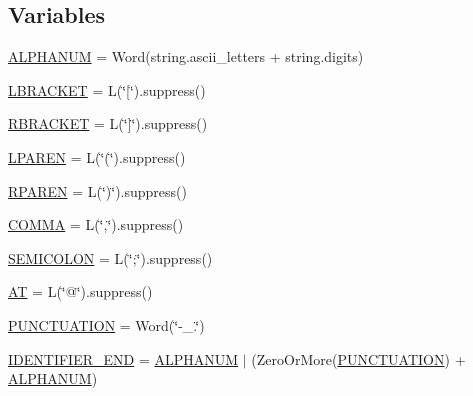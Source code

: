 \subsection*{Variables}
\begin{DoxyCompactItemize}
\item 
\hyperlink{namespacepkg__resources_1_1__vendor_1_1packaging_1_1requirements_a1b6a0f93aab1e0de65e69f84fdd3fc4d}{A\+L\+P\+H\+A\+N\+UM} = Word(string.\+ascii\+\_\+letters + string.\+digits)
\item 
\hyperlink{namespacepkg__resources_1_1__vendor_1_1packaging_1_1requirements_a6981533f5347746cbc109a2be33dd020}{L\+B\+R\+A\+C\+K\+ET} = L(\char`\"{}\mbox{[}\char`\"{}).suppress()
\item 
\hyperlink{namespacepkg__resources_1_1__vendor_1_1packaging_1_1requirements_abbada36c7d12f89f9f8dbe5eed7e38e1}{R\+B\+R\+A\+C\+K\+ET} = L(\char`\"{}\mbox{]}\char`\"{}).suppress()
\item 
\hyperlink{namespacepkg__resources_1_1__vendor_1_1packaging_1_1requirements_aba638d4a7a02c4f6f8ffbeab724fc830}{L\+P\+A\+R\+EN} = L(\char`\"{}(\char`\"{}).suppress()
\item 
\hyperlink{namespacepkg__resources_1_1__vendor_1_1packaging_1_1requirements_a574a651b148dc603efe931b6a86da736}{R\+P\+A\+R\+EN} = L(\char`\"{})\char`\"{}).suppress()
\item 
\hyperlink{namespacepkg__resources_1_1__vendor_1_1packaging_1_1requirements_a9ab8299202b519b3a7135ddadb5d7fe4}{C\+O\+M\+MA} = L(\char`\"{},\char`\"{}).suppress()
\item 
\hyperlink{namespacepkg__resources_1_1__vendor_1_1packaging_1_1requirements_adedef3a0386c0115ceeccd5722983b22}{S\+E\+M\+I\+C\+O\+L\+ON} = L(\char`\"{};\char`\"{}).suppress()
\item 
\hyperlink{namespacepkg__resources_1_1__vendor_1_1packaging_1_1requirements_a17fe47e230847213e62d4c11fb80e042}{AT} = L(\char`\"{}@\char`\"{}).suppress()
\item 
\hyperlink{namespacepkg__resources_1_1__vendor_1_1packaging_1_1requirements_a4a9bf3636e77b3a6e9167ed836ff570e}{P\+U\+N\+C\+T\+U\+A\+T\+I\+ON} = Word(\char`\"{}-\/\+\_\+.\char`\"{})
\item 
\hyperlink{namespacepkg__resources_1_1__vendor_1_1packaging_1_1requirements_af4b6965e1e4945622373dc67f4352916}{I\+D\+E\+N\+T\+I\+F\+I\+E\+R\+\_\+\+E\+ND} = \hyperlink{namespacepkg__resources_1_1__vendor_1_1packaging_1_1requirements_a1b6a0f93aab1e0de65e69f84fdd3fc4d}{A\+L\+P\+H\+A\+N\+UM} $\vert$ (Zero\+Or\+More(\hyperlink{namespacepkg__resources_1_1__vendor_1_1packaging_1_1requirements_a4a9bf3636e77b3a6e9167ed836ff570e}{P\+U\+N\+C\+T\+U\+A\+T\+I\+ON}) + \hyperlink{namespacepkg__resources_1_1__vendor_1_1packaging_1_1requirements_a1b6a0f93aab1e0de65e69f84fdd3fc4d}{A\+L\+P\+H\+A\+N\+UM})

\end{DoxyCompactItemize}
